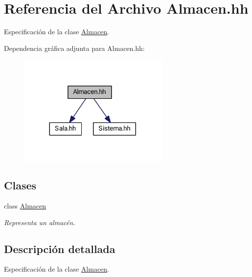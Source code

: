\hypertarget{_almacen_8hh}{}\section{Referencia del Archivo Almacen.\+hh}
\label{_almacen_8hh}


Especificación de la clase \hyperlink{class_almacen}{Almacen}.  


Dependencia gráfica adjunta para Almacen.\+hh\+:
\nopagebreak
\begin{figure}[H]
\begin{center}
\leavevmode
\includegraphics[width=212pt]{_almacen_8hh__incl}
\end{center}
\end{figure}
\subsection*{Clases}
\begin{DoxyCompactItemize}
\item 
class \hyperlink{class_almacen}{Almacen}
\begin{DoxyCompactList}\small\item\em Representa un almacén. \end{DoxyCompactList}\end{DoxyCompactItemize}


\subsection{Descripción detallada}
Especificación de la clase \hyperlink{class_almacen}{Almacen}. 

